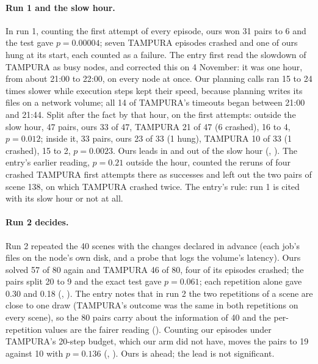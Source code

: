 \paragraph{Run 1 and the slow hour.} In run 1, counting the first attempt of every
episode, ours won 31 pairs to 6 and the test gave $p = 0.00004$; seven TAMPURA
episodes crashed and one of ours hung at its start, each counted as a failure. The
entry first read the slowdown of TAMPURA as busy nodes, and
corrected this on 4 November: it was one hour, from about 21:00 to 22:00, on every
node at once. Our planning calls ran 15 to 24 times slower while execution steps
kept their speed, because planning writes its files on a network volume; all 14 of
TAMPURA's timeouts began between 21:00 and 21:44. Split after the fact by that hour,
on the first attempts: outside the slow hour, 47 pairs, ours 33 of 47, TAMPURA 21 of 47
(6 crashed), 16 to 4, $p = 0.012$; inside it, 33 pairs, ours 23 of 33 (1 hung), TAMPURA
10 of 33 (1 crashed), 15 to 2, $p = 0.0023$. Ours leads in and out of the slow hour
(, ). The entry's earlier reading, $p = 0.21$
outside the hour, counted the reruns of four crashed TAMPURA first attempts there as
successes and left out the two pairs of scene 138, on which TAMPURA crashed twice. The
entry's rule: run 1 is cited with its slow hour or not at all.

\paragraph{Run 2 decides.} Run 2 repeated the 40 scenes with the changes declared
in advance (each job's files on the node's own disk, and a probe that logs the
volume's latency). Ours solved 57 of 80 again and TAMPURA 46 of 80, four of its
episodes crashed; the pairs split 20 to 9 and the exact test gave $p = 0.061$; each
repetition alone gave 0.30 and 0.18 (, ).
The entry notes that in run 2 the two repetitions of a scene are close to one draw
(TAMPURA's outcome was the same in both repetitions on every scene), so the 80 pairs
carry about the information of 40 and the per-repetition values are the fairer reading
(). Counting our episodes under TAMPURA's 20-step budget, which our arm did not
have, moves the pairs to 19 against 10 with $p = 0.136$ (, ). Ours is ahead; the lead is not significant. 

